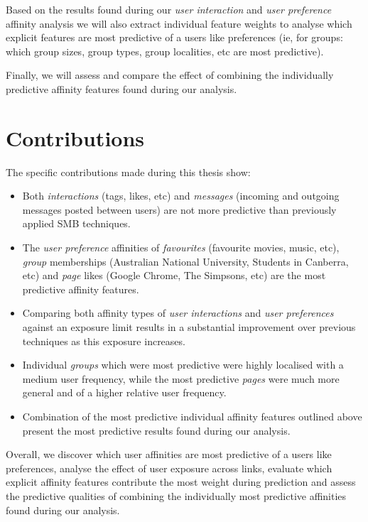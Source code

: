 Based on the results found during our \emph{user interaction} and \emph{user preference} affinity analysis we will also extract individual feature 
weights to analyse which explicit features are most predictive of a users like preferences 
(ie, for groups: which group sizes, group types, group localities, etc are most predictive).

Finally, we will assess and compare the effect of combining the individually predictive affinity features found during our analysis.

\section{Contributions}
\label{sec:contributions}

The specific contributions made during this thesis show:

\begin{itemize}
\item Both \emph{interactions} (tags, likes, etc) and \emph{messages} (incoming and outgoing messages posted between users) are not more predictive than 
previously applied SMB techniques.
\item The \emph{user preference} affinities of \emph{favourites} (favourite movies, music, etc), \emph{group} memberships (Australian National University, Students in Canberra, etc) 
and \emph{page} likes (Google Chrome, The Simpsons, etc) are the most predictive affinity features.
\item Comparing both affinity types of \emph{user interactions} and \emph{user preferences} against an exposure limit results in a 
substantial improvement over previous techniques as this exposure increases.
\item Individual \emph{groups} which were most predictive were highly localised with a medium user frequency, while the most predictive 
\emph{pages} were much more general and of a higher relative user frequency.
\item Combination of the most predictive individual affinity features outlined above present the most predictive results found during our analysis.
\end{itemize} 

Overall, we discover which user affinities are most predictive of a users like preferences, analyse the effect of user exposure across links, 
evaluate which explicit affinity features contribute the most weight during prediction and assess the predictive qualities of combining 
the individually most predictive affinities found during our analysis.

